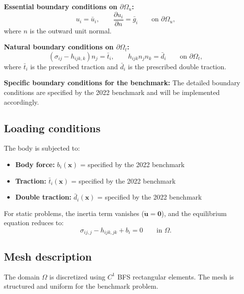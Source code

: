 \documentclass[11pt]{article}
\newcommand{\bx}{\mathbf{x}}
\newcommand{\bx}{\mathbf{x}}
\begin{document}
\textbf{Essential boundary conditions on $\partial\Omega_{u}$:}
\begin{equation}
u_{i} = \bar{u}_{i},
\qquad
\frac{\partial u_{i}}{\partial n} = \bar{g}_{i}
\qquad\text{on }\partial\Omega_{u},
\label{s8:essBC}
\end{equation}
where $n$ is the outward unit normal.

\textbf{Natural boundary conditions on $\partial\Omega_{t}$:}
\begin{equation}
(\sigma_{ij}-h_{ijk,k})n_{j} = \bar{t}_{i},
\qquad
h_{ijk}n_{j}n_{k} = \bar{d}_{i}
\qquad\text{on }\partial\Omega_{t},
\label{s8:natBC}
\end{equation}
where $\bar{t}_{i}$ is the prescribed traction and $\bar{d}_{i}$ is the
prescribed double traction.

\textbf{Specific boundary conditions for the benchmark:}
The detailed boundary conditions are specified by the 2022 benchmark and will be implemented accordingly.

\subsection{Loading conditions}
\label{ssec:loading}

The body is subjected to:
\begin{itemize}
\item \textbf{Body force:} $b_{i}(\bx)$ = specified by the 2022 benchmark
\item \textbf{Traction:} $\bar{t}_{i}(\bx)$ = specified by the 2022 benchmark
\item \textbf{Double traction:} $\bar{d}_{i}(\bx)$ = specified by the 2022 benchmark
\end{itemize}

For static problems, the inertia term vanishes ($\ddot{\mathbf{u}}=\mathbf{0}$),
and the equilibrium equation reduces to:
\begin{equation}
\sigma_{ij,j} - h_{ijk,jk} + b_{i} = 0
\qquad\text{in }\Omega.
\label{s8:equilibrium}
\end{equation}

\subsection{Mesh description}
\label{ssec:mesh}

The domain $\Omega$ is discretized using $C^{1}$ BFS rectangular
elements. The mesh is structured and uniform for the benchmark problem.
\end{document}
